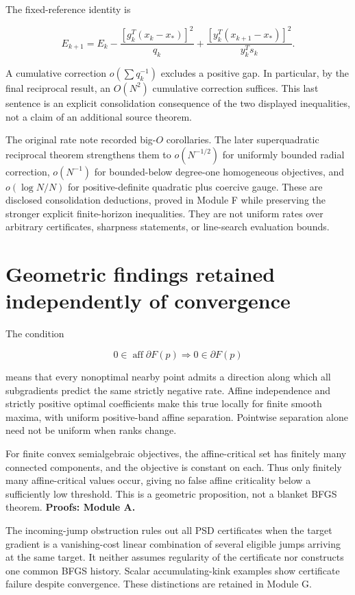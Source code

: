 The fixed-reference identity is

\[E_{k+1}=E_k-\frac{[g_k^T(x_k-x_*)]^2}{q_k}
+\frac{[y_k^T(x_{k+1}-x_*)]^2}{y_k^Ts_k}.\]

A cumulative correction \(o(\sum q_k^{-1})\) excludes a positive gap. In particular, by the final reciprocal result, an \(O(N^2)\) cumulative correction suffices. This last sentence is an explicit consolidation consequence of the two displayed inequalities, not a claim of an additional source theorem.

The original rate note recorded big-\(O\) corollaries. The later superquadratic reciprocal theorem strengthens them to \(o(N^{-1/2})\) for uniformly bounded radial correction, \(o(N^{-1})\) for bounded-below degree-one homogeneous objectives, and \(o(\log N/N)\) for positive-definite quadratic plus coercive gauge. These are disclosed consolidation deductions, proved in Module F while preserving the stronger explicit finite-horizon inequalities. They are not uniform rates over arbitrary certificates, sharpness statements, or line-search evaluation bounds.

\section{Geometric findings retained independently of convergence}\label{geometric-findings-retained-independently-of-convergence}

The condition

\[0\in\operatorname{aff}\partial F(p)\Longrightarrow0\in\partial F(p)\]

means that every nonoptimal nearby point admits a direction along which all subgradients predict the same strictly negative rate. Affine independence and strictly positive optimal coefficients make this true locally for finite smooth maxima, with uniform positive-band affine separation. Pointwise separation alone need not be uniform when ranks change.

For finite convex semialgebraic objectives, the affine-critical set has finitely many connected components, and the objective is constant on each. Thus only finitely many affine-critical values occur, giving no false affine criticality below a sufficiently low threshold. This is a geometric proposition, not a blanket BFGS theorem. \textbf{Proofs: Module A.}

The incoming-jump obstruction rules out all PSD certificates when the target gradient is a vanishing-cost linear combination of several eligible jumps arriving at the same target. It neither assumes regularity of the certificate nor constructs one common BFGS history. Scalar accumulating-kink examples show certificate failure despite convergence. These distinctions are retained in Module G.


